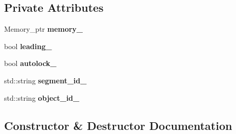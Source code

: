 \subsection*{Private Attributes}
\begin{DoxyCompactItemize}
\item 
Memory\+\_\+ptr {\bfseries memory\+\_\+}\hypertarget{classshared__memory_1_1Exchange__manager__consumer_a65f7ea81649be03ac11b11bc998d5047}{}\label{classshared__memory_1_1Exchange__manager__consumer_a65f7ea81649be03ac11b11bc998d5047}

\item 
bool {\bfseries leading\+\_\+}\hypertarget{classshared__memory_1_1Exchange__manager__consumer_a3d2838c1a3e709dafe1c941f217d8f54}{}\label{classshared__memory_1_1Exchange__manager__consumer_a3d2838c1a3e709dafe1c941f217d8f54}

\item 
bool {\bfseries autolock\+\_\+}\hypertarget{classshared__memory_1_1Exchange__manager__consumer_a6ea7ce15b0da981027f80d3d35825593}{}\label{classshared__memory_1_1Exchange__manager__consumer_a6ea7ce15b0da981027f80d3d35825593}

\item 
std\+::string {\bfseries segment\+\_\+id\+\_\+}\hypertarget{classshared__memory_1_1Exchange__manager__consumer_a830f88a2c6f6d3cf6e0c83353a436742}{}\label{classshared__memory_1_1Exchange__manager__consumer_a830f88a2c6f6d3cf6e0c83353a436742}

\item 
std\+::string {\bfseries object\+\_\+id\+\_\+}\hypertarget{classshared__memory_1_1Exchange__manager__consumer_afbde973522ab55b0a3c49ef6f26fbba5}{}\label{classshared__memory_1_1Exchange__manager__consumer_afbde973522ab55b0a3c49ef6f26fbba5}

\end{DoxyCompactItemize}


\subsection{Constructor \& Destructor Documentation}
